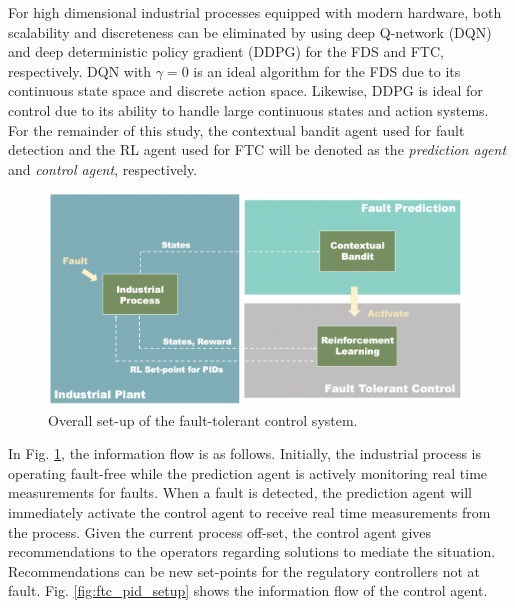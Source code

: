 For high dimensional industrial processes equipped with modern hardware, both scalability and discreteness can be eliminated by using deep Q-network (DQN) and deep deterministic policy gradient (DDPG) for the FDS and FTC, respectively.  DQN with $\gamma = 0$ is an ideal algorithm for the FDS due to its continuous state space and discrete action space. Likewise, DDPG is ideal for control due to its ability to handle large continuous states and action systems. For the remainder of this study, the contextual bandit agent used for fault detection and the RL agent used for FTC will be denoted as the \textit{prediction agent} and \textit{control agent}, respectively.

\begin{figure}[H]
    \begin{center}
        \includegraphics[width=11cm]{images/ftc/FTC_Setup.png}
        \caption{\label{fig:ftc_setup} Overall set-up of the fault-tolerant control system.}
    \end{center}
\end{figure}
In Fig. \ref{fig:ftc_setup}, the information flow is as follows.  Initially, the industrial process is operating fault-free while the prediction agent is actively monitoring real time measurements for faults.  When a fault is detected, the prediction agent will immediately activate the control agent to receive real time measurements from the process.  Given the current process off-set, the control agent gives recommendations to the operators regarding solutions to mediate the situation.  Recommendations can be new set-points for the regulatory controllers not at fault.
Fig. \ref{fig:ftc_pid_setup} shows the information flow of the control agent. 
